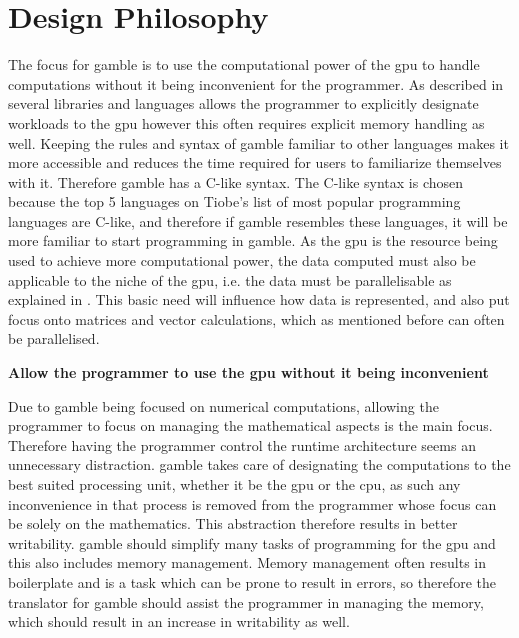\section{Design Philosophy}\label{sec:phil}

The focus for \gls{gamble} is to use the computational power of the \acrshort{gpu} to handle computations without it being inconvenient for the programmer.
As described in  several libraries and languages allows the programmer to explicitly designate workloads to the \acrshort{gpu} however this often requires explicit memory handling as well.
Keeping the rules and syntax of \gls{gamble} familiar to other languages makes it more accessible and reduces the time required for users to familiarize themselves with it.
Therefore \gls{gamble} has a C-like syntax.
The C-like syntax is chosen because the top 5 languages on Tiobe's list of most popular programming languages are C-like, and therefore if \gls{gamble} resembles these languages, it will be more familiar to start programming in \gls{gamble}.\citep{TIOBE}
As the \acrshort{gpu} is the resource being used to achieve more computational power, the data computed must also be applicable to the niche of the \acrshort{gpu}, i.e. the data must be parallelisable as explained in .
This basic need will influence how data is represented, and also put focus onto matrices and vector calculations, which as mentioned before can often be parallelised.

\textbf{Allow the programmer to use the \acrshort{gpu} without it being inconvenient}

Due to \gls{gamble} being focused on numerical computations, allowing the programmer to focus on managing the mathematical aspects is the main focus.
Therefore having the programmer control the runtime architecture seems an unnecessary distraction.
\gls{gamble} takes care of designating the computations to the best suited processing unit, whether it be the \acrshort{gpu} or the \acrshort{cpu}, as such any inconvenience in that process is removed from the programmer whose focus can be solely on the mathematics.
This abstraction therefore results in better writability.
\gls{gamble} should simplify many tasks of programming for the \gls{gpu} and this also includes memory management.
Memory management often results in boilerplate and is a task which can be prone to result in errors, so therefore the translator for \gls{gamble} should assist the programmer in managing the memory, which should result in an increase in writability as well. 

